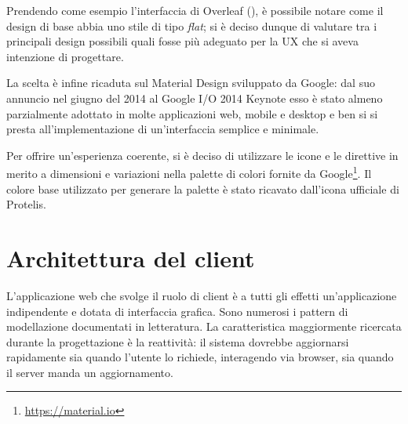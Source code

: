       Prendendo come esempio l'interfaccia di Overleaf (), è possibile notare come il design di base abbia uno stile di tipo \emph{flat};
      si è deciso dunque di valutare tra i principali design possibili quali fosse più adeguato per la UX che si aveva intenzione di progettare.

      La scelta è infine ricaduta sul Material Design sviluppato da Google:
      dal suo annuncio nel giugno del 2014 al Google I/O 2014 Keynote esso è stato almeno parzialmente adottato in molte applicazioni web, mobile e desktop
      e ben si si presta all'implementazione di un'interfaccia semplice e minimale. %

      Per offrire un'esperienza coerente, si è deciso di utilizzare le icone e le direttive in merito a dimensioni e variazioni nella palette di colori fornite da Google\footnote{\url{https://material.io}}.
      Il colore base utilizzato per generare la palette è stato ricavato dall'icona ufficiale di Protelis. %

  \section{Architettura del client}\label{sec:arch:client}

    L'applicazione web che svolge il ruolo di client è a tutti gli effetti un'applicazione indipendente e dotata di interfaccia grafica.
    Sono numerosi i pattern di modellazione documentati in letteratura.
    La caratteristica maggiormente ricercata durante la progettazione è la reattività:
    il sistema dovrebbe aggiornarsi rapidamente sia quando l'utente lo richiede, interagendo via browser, sia quando il server manda un aggiornamento.



